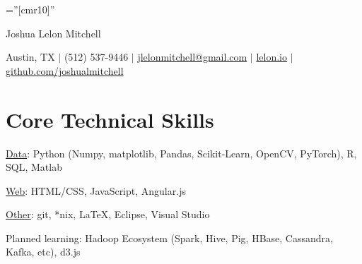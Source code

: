 \documentclass[a4paper,10pt]{article}
\begin{document}

\pagestyle{empty} %

\font\fb=''[cmr10]'' %

\par{\centering
		{\Huge Joshua Lelon Mitchell
	}\par}
\par{\centering
		{
	Austin, TX
	$\mid$
	(512) 537-9446
	$\mid$
	\href {mailto:jlelonmitchell@gmail.com}{jlelonmitchell@gmail.com}
	$\mid$
	\href {http://lelon.io/blog/2018/01/04/to-potential-employers}{lelon.io}
	$\mid$
	\href {https://github.com/joshualmitchell}{github.com/joshualmitchell}
}\par}

\section{Core Technical Skills}

\underline{Data}: Python (Numpy, matplotlib, Pandas, Scikit-Learn, OpenCV, PyTorch), R, SQL, Matlab

\underline{Web}: HTML/CSS, JavaScript, Angular.js

\underline{Other}: git, *nix, LaTeX, Eclipse, Visual Studio

Planned learning: Hadoop Ecosystem (Spark, Hive, Pig, HBase, Cassandra, Kafka, etc), d3.js

\end{document}
